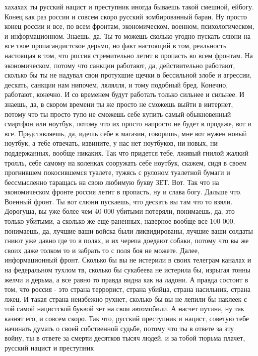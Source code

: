 хахахах ты русский нацист и преступник иногда бываешь такой смешной, ейбогу.
Конец как раз россии и совсем скоро русский зомбированный баран. Ну просто
конец россии и все, по всем фронтам, экономическом, военном, психологическом, и
информационном. Знаешь, да. Ты то можешь сколько угодно пускать слюни на все
твое пропагандистское дерьмо, но факт настоящий в том, реальность настоящая в
том, что россия стремительно летит в пропасть во всем фронтам. На
экономическом, потому что санкции работают, да, действительно работают, сколько
бы ты не надувал свои протухшие щечки в бессильной злобе и агрессии, дескать,
санкции нам нипочем, лялялля, и тому подобный бред. Конечно, работают, конечно.
И со временем будут работать только сильнее и сильнее. И знаешь, да, в скором
времени ты же просто не сможешь выйти в интернет, потому что ты просто тупо не
сможешь себе купить самый обыкновенный смартфон или ноутбук, потому что их
просто напросто не будет в продаже, вот и все. Представляешь, да, идешь себе в
магазин, говоришь, мне вот нужен новый ноутбук, а тебе отвечать, извините, у
нас нет ноутбуков, ни новых, ни поддержанных, вообще никаких. Так что придется
тебе, лживый гнилой жалкий тролль, себе самому на коленках сооружать себе
ноутбук, скажем, сидя в своем прогнившем покосившемся туалете, тужясь с рулоном
туалетной бумаги и бессмысленно таращась на свою любимую букву ЗЕТ. Вот. Так
что на экономическом фронте россия летит в пропасть, ну и слава богу. Дальше
что. Военный фронт. Ты вот слюни пускаешь, что дескать вы там что то взяли.
Дорогуша, вы уже более чем 40 000 убитыми потеряли, понимаешь, да, это только
убитыми, а сколько же еще раненных, наверное вообще все 100 000. понимаешь, да,
лучшие ваши войска были ликвидированы, лучшие ваши солдаты гниют уже давно где
то в полях, и их черепа доедают собаки, потому что вы же своих даже толком то и
забрать то с поля боя не можете. Далее, информационный фронт. Сколько бы вы не
истерили в своих телеграм каналах и на федеральном тухлом тв, сколько бы
сукабеева не истерила бы, изрыгая тонны желчи и дерьма, а все равно то правда
видна как на ладони. А правда состоит в том, что россия - это страна террорист,
страна убийца, страна насильник, страна лжец. И такая страна неизбежно рухнет,
сколько бы вы не лепили бы наклеек с той самой нацистской буквой зет на свои
автомобили. А насчет путина, ну так казнят его, и совсем скоро. Так что,
русский преступник и нацист, советую тебе начинать думать о своей собственной
судьбе, потому что ты в ответе за эту войну, ты в ответе за смерти десятков
тысяч людей, и за тобой тюрьма плачет, русский нацист и преступник

